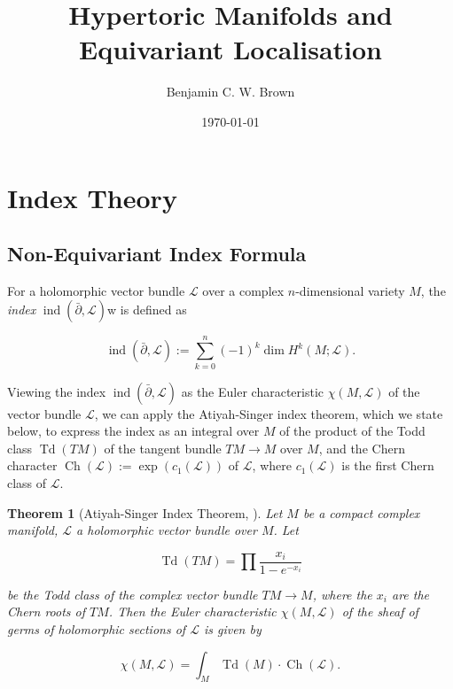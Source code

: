 \documentclass[11pt]{amsart}
\title{Hypertoric Manifolds and Equivariant Localisation}
\author{Benjamin C. W. Brown}
\date{\today}
\newtheorem{theorem}{Theorem}[section]
\newcommand{\ra}{\rightarrow}
\newcommand{\mcL}{\mathcal{L}}
\newcommand{\dbar}{\bar{\partial}}
\DeclareMathOperator{\ind}{ind}
\DeclareMathOperator{\Td}{Td}
\DeclareMathOperator{\Ch}{Ch}
\begin{document}
\maketitle
 

\section{Index Theory} \label{sec:index-theory}

\subsection{Non-Equivariant Index Formula} \label{subsec:non-equivariant-index-formula}

For a holomorphic vector bundle $\mcL$ over a complex $n$-dimensional variety $M$, the \emph{index} $\ind(\dbar, \mcL)$w is defined as

\begin{equation*}
	\ind(\dbar, \mcL) := \sum\limits_{k = 0}^{n}(-1)^{k}\dim H^{k}(M; \mcL).
\end{equation*}

Viewing the index $\ind(\dbar, \mcL)$ as the Euler characteristic $\chi(M, \mcL)$ of the vector bundle $\mcL$, we can apply the Atiyah-Singer index theorem, which we state below, to express the index as an integral over $M$ of the product of the Todd class $\Td(TM)$ of the tangent bundle $TM \ra M$ over $M$, and the Chern character $\Ch(\mcL) := \exp(c_{1}(\mcL))$ of $\mcL$, where $c_{1}(\mcL)$ is the first Chern class of $\mcL$.

\begin{theorem}[Atiyah-Singer Index Theorem, \cite{MAIS1968}]
	\label{thm:atiyah-singer-index-theorem}
	Let $M$ be a compact complex manifold, $\mcL$ a holomorphic vector bundle over $M$. Let

	\begin{equation*}
		\Td(TM) = \prod \frac{x_{i}}{1 - e^{-x_{i}}}
	\end{equation*}

	be the Todd class of the complex vector bundle $TM \ra M$, where the $x_{i}$ are the Chern roots of $TM$. Then the Euler characteristic $\chi(M, \mcL)$ of the sheaf of germs of holomorphic sections of $\mcL$ is given by
	
	\begin{equation*}
		\chi(M, \mcL) = \int_{M} \Td(M)\cdot \Ch(\mcL).
	\end{equation*}
\end{theorem}
\end{document}
